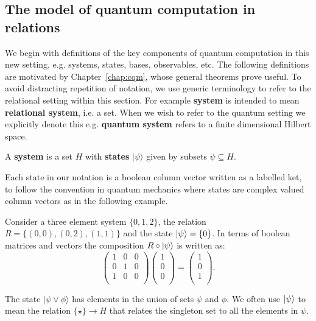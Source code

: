 \subsection{The model of quantum computation in relations}
\label{sec:modelqcrel}
We begin with definitions of the key components of quantum computation in this new setting, e.g. systems, states, bases, observables, etc.  The following definitions are motivated by Chapter~\ref{chap:cqm}, whose general theorems prove useful. To avoid distracting repetition of notation, we use generic terminology to refer to the relational setting within this section.  For example \textbf{system} is intended to mean \textbf{relational system}, i.e. a set.  When we wish to refer to the quantum setting we explicitly denote this e.g. \textbf{quantum system} refers to a finite dimensional Hilbert space.

\begin{axiom}
A \textbf{system} is a set $H$ with \textbf{states} $|\psi\rangle$ given by subsets $\psi\subseteq H$.
\end{axiom}


\noindent Each state in our notation is a boolean column vector written as a labelled ket, to follow the convention in quantum mechanics where states are complex valued column vectors as in the following example. 
\begin{example}
\label{ex:columnvect}
Consider a three element system $\{0,1,2\}$, the relation $R=\{(0,0),(0,2),(1,1)\}$ and the state $| \psi \rangle=\{0\}$. In terms of boolean matrices and vectors the composition $R\circ| \psi \rangle$ is written as:
\begin{equation}
\left(\begin{array}{ccc}
1 & 0 & 0 \\
0 & 1 & 0 \\
1 & 0 & 0 \\
\end{array}\right)
\left(\begin{array}{c}
1 \\
0 \\
0 \\
\end{array}\right)
=
\left(\begin{array}{c}
1 \\
0 \\
1 \\
\end{array}\right).
\end{equation}
\end{example}
The state $|\psi\vee\phi\rangle$ has elements in the union of sets $\psi$ and $\phi$. We often use $| \psi \rangle$ to mean the relation $\{\star\}\to H$ that relates the singleton set to all the elements in $\psi$.

